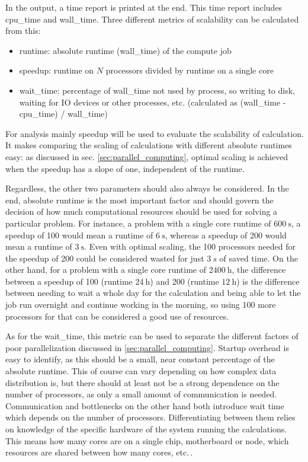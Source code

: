 \documentclass[main.tex]{subfiles}
\begin{document}
In the \QE output, a time report is printed at the end.
This time report includes \gls{cpu_time} and \gls{wall_time}.
Three different metrics of scalability can be calculated from this:
\begin{itemize}
    \item runtime: absolute runtime (\gls{wall_time}) of the compute job
    \item speedup: runtime on \(N\) processors divided by runtime on a single core
    \item \gls{wait_time}: percentage of \gls{wall_time} not used by \QE process, so writing to disk, waiting for IO devices or other processes, etc. (calculated as (\gls{wall_time} - \gls{cpu_time}) / \gls{wall_time})
\end{itemize}
For analysis mainly speedup will be used to evaluate the scalability of \QE calculation.
It makes comparing the scaling of calculations with different absolute runtimes easy: as discussed in sec. \ref{sec:parallel_computing}, optimal scaling is achieved when the speedup has a slope of one, independent of the runtime.

Regardless, the other two parameters should also always be considered.
In the end, absolute runtime is the most important factor and should govern the decision of how much computational resources should be used for solving a particular problem.
For instance, a problem with a single core runtime of \(\SI{600}{\s}\), a speedup of 100 would mean a runtime of \(\SI{6}{\s}\), whereas a speedup of 200 would mean a runtime of \(\SI{3}{\s}\).
Even with optimal scaling, the 100 processors needed for the speedup of 200 could be considered wasted for just \(\SI{3}{s}\) of saved time.
On the other hand, for a problem with a single core runtime of \(\SI{2400}{\hour}\), the difference between a speedup of 100 (runtime \(\SI{24}{\hour}\)) and 200 (runtime \(\SI{12}{\hour}\)) is the difference between needing to wait a whole day for the calculation and being able to let the job run overnight and continue working in the morning, so using 100 more processors for that can be considered a good use of resources.

As for the \gls{wait_time}, this metric can be used to separate the different factors of poor parallelization discussed in \ref{sec:parallel_computing}.
Startup overhead is easy to identify, as this should be a small, near constant percentage of the absolute runtime.
This of course can vary depending on how complex data distribution is, but there should at least not be a strong dependence on the number of processors, as only a small amount of communication is needed.
Communication and bottlenecks on the other hand both introduce wait time which depends on the number of processors.
Differentiating between them relies on knowledge of the specific hardware of the system running the calculations.
This means how many cores are on a single chip, motherboard or node, which resources are shared between how many cores, etc.\,.
\end{document}
